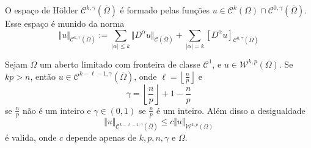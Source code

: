 \documentclass[a4paper, 11pt]{book}
\theoremstyle{definition}
\newcommand{\cC}{\mathcal{C}}
\newcommand{\cW}{\mathcal{W}}
\begin{document}
\begin{dbox}
    O espaço de Hölder $\cC^{k,\gamma}(\overline\Omega)$ é formado pelas funções $u \in \cC^k(\Omega) \cap \cC^{0,\gamma}(\overline\Omega)$. Esse espaço é munido da norma
    \[
        \Vert u \Vert_{\cC^{k,\gamma}(\overline\Omega)} := \sum_{|\alpha| \leqslant k} \Vert D^{\alpha}u \Vert_{\cC(\overline\Omega)} + \sum_{|\alpha| = k} [D^\alpha u]_{\cC^{0,\gamma}(\overline\Omega)}
    \] 
\end{dbox}

\begin{tbox}
    Sejam $\Omega$ um aberto limitado com fronteira de classe $\cC^1$, e $u \in \cW^{k,p}(\Omega)$. 
    Se $kp > n$, então $u \in \cC^{k - \ell - 1,\gamma}(\overline\Omega)$, onde $\ell = \left\lfloor \frac{n}{p} \right\rfloor$ e
    \[
        \gamma = \left\lfloor \frac{n}{p} \right\rfloor + 1 - \frac{n}{p}
    \]
    se $\frac{n}{p}$ não é um inteiro e $\gamma \in (0,1)$ se $\frac{n}{p}$ é um inteiro.
    Além disso a desigualdade
    \[
        \Vert u \Vert_{\cC^{k - \ell - 1,\gamma}(\overline\Omega)} \leqslant c \Vert u \Vert_{\cW^{k,p}(\Omega)}
    \]
    é valida, onde $c$ depende apenas de $k, p, n, \gamma$ e $\Omega$.
\end{tbox}
\end{document}
